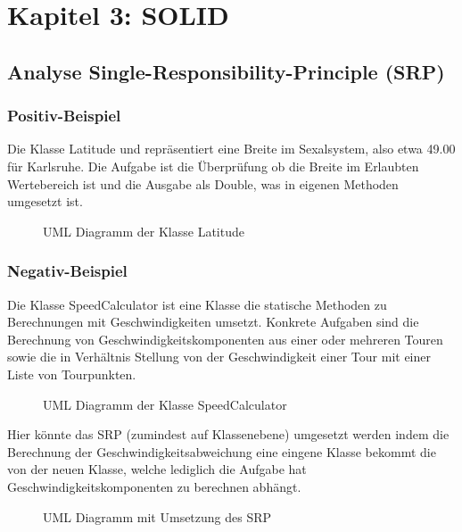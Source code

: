 \section{Kapitel 3: SOLID}

\subsection{Analyse Single-Responsibility-Principle (SRP)}

\subsubsection{Positiv-Beispiel}

Die Klasse Latitude und repräsentiert eine Breite im Sexalsystem, also etwa 49.00 für Karlsruhe. Die Aufgabe ist die Überprüfung ob die Breite im Erlaubten Wertebereich ist und die Ausgabe als Double, was in eigenen Methoden umgesetzt ist.

\begin{figure}[h]
  \centering
  
  \caption{UML Diagramm der Klasse Latitude}
\end{figure}

\subsubsection{Negativ-Beispiel}

Die Klasse SpeedCalculator ist eine Klasse die statische Methoden zu Berechnungen mit Geschwindigkeiten umsetzt. Konkrete Aufgaben sind die Berechnung von Geschwindigkeitskomponenten aus einer oder mehreren Touren sowie die in Verhältnis Stellung von der Geschwindigkeit einer Tour mit einer Liste von Tourpunkten.

\begin{figure}[h]
  \centering
  
  \caption{UML Diagramm der Klasse SpeedCalculator}
\end{figure}

Hier könnte das SRP (zumindest auf Klassenebene) umgesetzt werden indem die Berechnung der Geschwindigkeitsabweichung eine eingene Klasse bekommt die von der neuen Klasse, welche lediglich die Aufgabe hat Geschwindigkeitskomponenten zu berechnen abhängt.

\begin{figure}[h]
  \centering
  
  \caption{UML Diagramm mit Umsetzung des SRP}
\end{figure}

